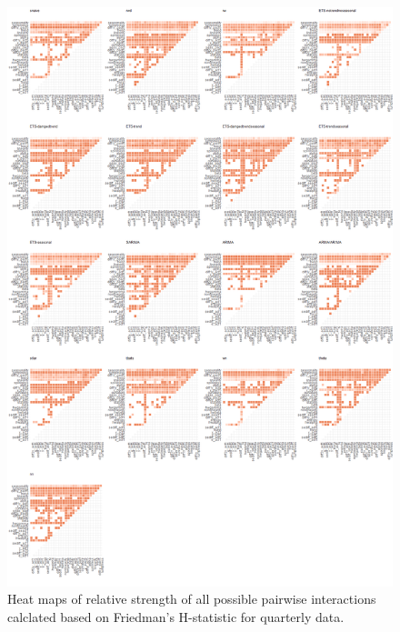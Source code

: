 \documentclass[11pt,a4paper,]{article}
\theoremstyle{definition}
\theoremstyle{definition}
\theoremstyle{definition}
\theoremstyle{remark}
\begin{document}
\begin{figure}
\centering
\includegraphics{figures/friedmanQ-1.png}
\caption{\label{fig:friedmanQ}Heat maps of relative strength of all possible
pairwise interactions calclated based on Friedman's H-statistic for
quarterly data.}
\end{figure}

\newpage
\end{document}
